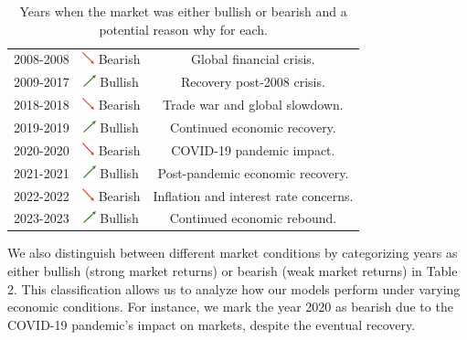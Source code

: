 \documentclass{article}
\begin{document}
\begin{table}[H]
\begin{tabular}{|c|c|c|}
        2008-2008 & \includegraphics[height=10pt]{red_line.png} Bearish & Global financial crisis. \\
        2009-2017 & \includegraphics[height=10pt]{green_line.png} Bullish & Recovery post-2008 crisis. \\
        2018-2018 & \includegraphics[height=10pt]{red_line.png} Bearish & Trade war and global slowdown. \\
        2019-2019 & \includegraphics[height=10pt]{green_line.png} Bullish & Continued economic recovery. \\
        2020-2020 & \includegraphics[height=10pt]{red_line.png} Bearish & COVID-19 pandemic impact. \\
        2021-2021 & \includegraphics[height=10pt]{green_line.png} Bullish & Post-pandemic economic recovery. \\
        2022-2022 & \includegraphics[height=10pt]{red_line.png} Bearish & Inflation and interest rate concerns. \\
        2023-2023 & \includegraphics[height=10pt]{green_line.png} Bullish & Continued economic rebound. \\
        \hline

    \end{tabular}
    \caption{Years when the market was either bullish or bearish and a potential reason why for each.}
    \label{tab}
\end{table}

We also distinguish between different market conditions by categorizing years as either bullish (strong market returns) or bearish (weak market returns) in Table 2. This classification allows us to analyze how our models perform under varying economic conditions. For instance, we mark the year 2020 as bearish due to the COVID-19 pandemic's impact on markets, despite the eventual recovery.
\end{document}
